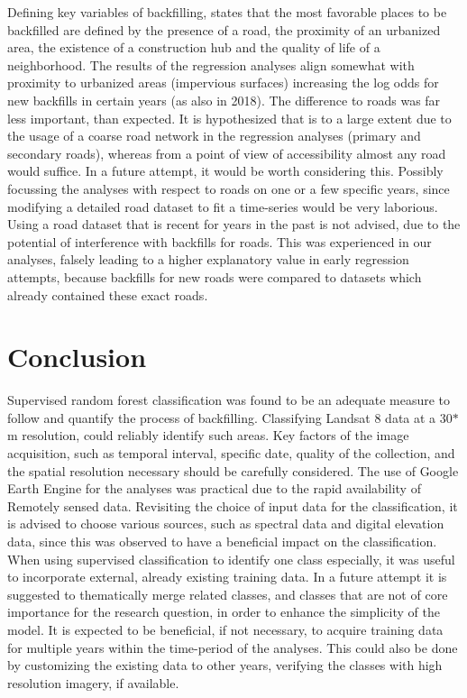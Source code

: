 \documentclass[11pt, A4, oneside]{report}
\begin{document}
Defining key variables of backfilling, \citet{Abrieu.2011} states that the most favorable places to be backfilled are defined by the presence of a road, the proximity of an urbanized area, the existence of a construction hub and the quality of life of a neighborhood. The results of the regression analyses align somewhat with proximity to urbanized areas (impervious surfaces) increasing the log odds for new backfills in certain years (as also in 2018). The difference to roads was far less important, than expected. It is hypothesized that is to a large extent due to the usage of a coarse road network in the regression analyses (primary and secondary roads), whereas from a point of view of accessibility almost any road would suffice. In a future attempt, it would be worth considering this. Possibly focussing the analyses with respect to roads on one or a few specific years, since modifying a detailed road dataset to fit a time-series would be very laborious. Using a road dataset that is recent for years in the past is not advised, due to the potential of interference with backfills for roads. This was experienced in our analyses, falsely leading to a higher explanatory value in early regression attempts, because backfills for new roads were compared to datasets which already contained these exact roads.


\chapter{Conclusion}

Supervised random forest classification was found to be an adequate measure to follow and quantify the process of backfilling. Classifying Landsat 8 data at a 30$*$m resolution, could reliably identify such areas. Key factors of the image acquisition, such as temporal interval, specific date, quality of the collection, and the spatial resolution necessary should be carefully considered. The use of Google Earth Engine for the analyses was practical due to the rapid availability of Remotely sensed data. Revisiting the choice of input data for the classification, it is advised to choose various sources, such as spectral data and digital elevation data, since this was observed to have a beneficial impact on the classification. When using supervised classification to identify one class especially, it was useful to incorporate external, already existing training data. In a future attempt it is suggested to thematically merge related classes, and classes that are not of core importance for the research question, in order to enhance the simplicity of the model. It is expected to be beneficial, if not necessary, to acquire training data for multiple years within the time-period of the analyses. This could also be done by customizing the existing data to other years, verifying the classes with high resolution imagery, if available.
\end{document}
